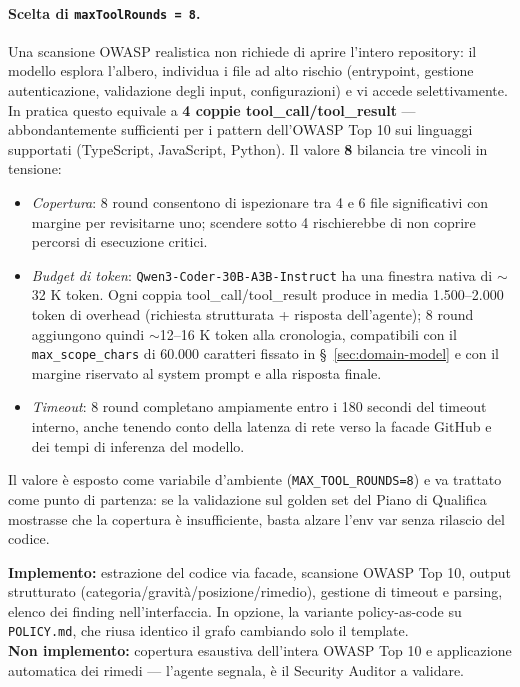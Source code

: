 \documentclass[11pt,a4paper]{article}
\begin{document}
\paragraph{Scelta di \texttt{maxToolRounds = 8}.} Una scansione OWASP realistica non richiede di aprire l'intero repository: il modello esplora l'albero, individua i file ad alto rischio (entrypoint, gestione autenticazione, validazione degli input, configurazioni) e vi accede selettivamente. In pratica questo equivale a \textbf{4 coppie tool\_call/tool\_result} --- abbondantemente sufficienti per i pattern dell'OWASP Top 10 sui linguaggi supportati (TypeScript, JavaScript, Python). Il valore \textbf{8} bilancia tre vincoli in tensione:
\begin{itemize}
  \item \emph{Copertura}: 8 round consentono di ispezionare tra 4 e 6 file significativi con margine per revisitarne uno; scendere sotto 4 rischierebbe di non coprire percorsi di esecuzione critici.
  \item \emph{Budget di token}: \texttt{Qwen3-Coder-30B-A3B-Instruct} ha una finestra nativa di $\sim$32 K token. Ogni coppia tool\_call/tool\_result produce in media 1.500--2.000 token di overhead (richiesta strutturata + risposta dell'agente); 8 round aggiungono quindi $\sim$12--16 K token alla cronologia, compatibili con il \texttt{max\_scope\_chars} di 60.000 caratteri fissato in \S~\ref{sec:domain-model} e con il margine riservato al system prompt e alla risposta finale.
  \item \emph{Timeout}: 8 round completano ampiamente entro i 180 secondi del timeout interno, anche tenendo conto della latenza di rete verso la facade GitHub e dei tempi di inferenza del modello.
\end{itemize}
Il valore è esposto come variabile d'ambiente (\texttt{MAX\_TOOL\_ROUNDS=8}) e va trattato come punto di partenza: se la validazione sul golden set del Piano di Qualifica mostrasse che la copertura è insufficiente, basta alzare l'env var senza rilascio del codice.

\textbf{Implemento:} estrazione del codice via facade, scansione OWASP Top 10, output strutturato (categoria/gravità/posizione/rimedio), gestione di timeout e parsing, elenco dei finding nell'interfaccia. In opzione, la variante policy-as-code su \texttt{POLICY.md}, che riusa identico il grafo cambiando solo il template.\\
\textbf{Non implemento:} copertura esaustiva dell'intera OWASP Top 10 e applicazione automatica dei rimedi --- l'agente segnala, è il Security Auditor a validare.
\end{document}

